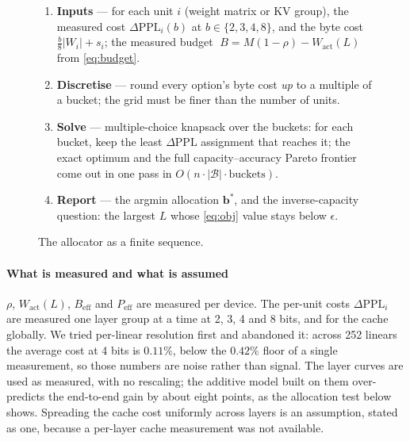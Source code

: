\documentclass[10pt,journal]{IEEEtran}
\newcommand{\rhoSym}{\rho}
\begin{document}
\begin{figure}[!t]
\centering
\footnotesize
\begin{minipage}[t]{0.48\textwidth}
\begin{enumerate}\setlength{\itemsep}{1pt}
  \item \textbf{Inputs} --- for each unit $i$ (weight matrix or KV group),
        the measured cost $\Delta\mathrm{PPL}_i(b)$ at $b \in \{2,3,4,8\}$, and
        the byte cost $\frac{b}{8}\lvert W_i\rvert + s_i$; the measured budget
        $\;B = M(1-\rhoSym) - W_{\mathrm{act}}(L)$ from \eqref{eq:budget}.
  \item \textbf{Discretise} --- round every option's byte cost \emph{up} to a
        multiple of a bucket; the grid must be finer than the number of units.
  \item \textbf{Solve} --- multiple-choice knapsack over the buckets: for each
        bucket, keep the least $\Delta\mathrm{PPL}$ assignment that reaches it;
        the exact optimum and the full capacity--accuracy Pareto frontier
        come out in one pass in $O(n \cdot \lvert\mathcal{B}\rvert \cdot
        \text{buckets})$.
  \item \textbf{Report} --- the argmin allocation $\mathbf b^*$, and the
        inverse-capacity question: the largest $L$ whose \eqref{eq:obj} value
        stays below $\epsilon$.
\end{enumerate}
\end{minipage}
\caption{The allocator as a finite sequence.}
\label{alg:alloc}
\end{figure}
\vspace{-2pt}

\paragraph*{What is measured and what is assumed}
$\rhoSym$, $W_{\mathrm{act}}(L)$, $B_{\mathrm{eff}}$ and $P_{\mathrm{eff}}$ are
measured per device. The per-unit costs $\Delta\mathrm{PPL}_i$ are measured one
layer group at a time at 2, 3, 4 and 8 bits, and for the cache globally. We tried
per-linear resolution first and abandoned it: across 252 linears the average cost
at 4 bits is $0.11\%$, below the $0.42\%$ floor of a single measurement, so those
numbers are noise rather than signal. The layer curves are used as measured, with
no rescaling; the additive model built on them over-predicts the end-to-end gain
by about eight points, as the allocation test below shows. Spreading the cache
cost uniformly across layers is an assumption, stated as one, because a
per-layer cache measurement was not available.
\end{document}
